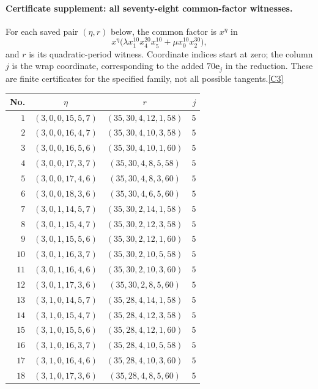 \documentclass[11pt]{article}
\newcommand{\src}[1]{\hyperlink{src:#1}{[#1]}}
\begin{document}
\endgroup

\paragraph{Certificate supplement: all seventy-eight common-factor witnesses.}
For each saved pair $(\eta,r)$ below, the common factor is $x^\eta$ in
\[
 x^\eta\bigl(\lambda x_1^{10}x_4^{20}x_5^{10}
               +\mu x_0^{10}x_2^{30}\bigr),
\]
and $r$ is its quadratic-period witness. Coordinate indices start at zero;
the column $j$ is the wrap coordinate, corresponding to the added
$70\mathbf e_j$ in the reduction. These are finite certificates for the
specified family, not all possible tangents.\src{C3}

\begin{longtable}{rccr}
\toprule
No. & $\eta$ & $r$ & $j$\\
\midrule
\endhead
$1$ & $(3,0,0,15,5,7)$ & $(35,30,4,12,1,58)$ & $5$\\
$2$ & $(3,0,0,16,4,7)$ & $(35,30,4,10,3,58)$ & $5$\\
$3$ & $(3,0,0,16,5,6)$ & $(35,30,4,10,1,60)$ & $5$\\
$4$ & $(3,0,0,17,3,7)$ & $(35,30,4,8,5,58)$ & $5$\\
$5$ & $(3,0,0,17,4,6)$ & $(35,30,4,8,3,60)$ & $5$\\
$6$ & $(3,0,0,18,3,6)$ & $(35,30,4,6,5,60)$ & $5$\\
$7$ & $(3,0,1,14,5,7)$ & $(35,30,2,14,1,58)$ & $5$\\
$8$ & $(3,0,1,15,4,7)$ & $(35,30,2,12,3,58)$ & $5$\\
$9$ & $(3,0,1,15,5,6)$ & $(35,30,2,12,1,60)$ & $5$\\
$10$ & $(3,0,1,16,3,7)$ & $(35,30,2,10,5,58)$ & $5$\\
$11$ & $(3,0,1,16,4,6)$ & $(35,30,2,10,3,60)$ & $5$\\
$12$ & $(3,0,1,17,3,6)$ & $(35,30,2,8,5,60)$ & $5$\\
$13$ & $(3,1,0,14,5,7)$ & $(35,28,4,14,1,58)$ & $5$\\
$14$ & $(3,1,0,15,4,7)$ & $(35,28,4,12,3,58)$ & $5$\\
$15$ & $(3,1,0,15,5,6)$ & $(35,28,4,12,1,60)$ & $5$\\
$16$ & $(3,1,0,16,3,7)$ & $(35,28,4,10,5,58)$ & $5$\\
$17$ & $(3,1,0,16,4,6)$ & $(35,28,4,10,3,60)$ & $5$\\
$18$ & $(3,1,0,17,3,6)$ & $(35,28,4,8,5,60)$ & $5$\\

\end{longtable}
\end{document}
